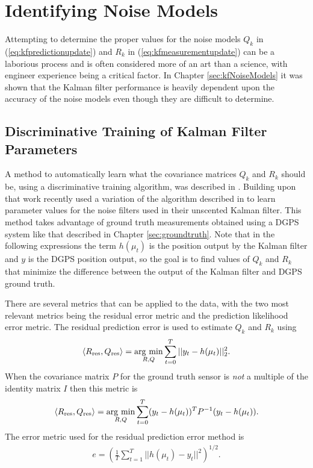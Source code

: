 \section{Identifying Noise Models}
\label{sec:kfIdentifyNoiseModels}
Attempting to determine the proper values for the noise models $Q_k$ in (\ref{eq:kfpredictionupdate}) and $R_k$ in (\ref{eq:kfmeasurementupdate}) can be a laborious process and is often considered more of an art than a science, with engineer experience being a critical factor. In Chapter \ref{sec:kfNoiseModels} it was shown that the Kalman filter performance is heavily dependent upon the accuracy of the noise models even though they are difficult to determine.

\subsection{Discriminative Training of Kalman Filter Parameters}
\label{sec:kftrainingparams}
A method to automatically learn what the covariance matrices $Q_k$ and $R_k$ should be, using a discriminative training algorithm, was described in \cite{Abbeel-RSS-05}. Building upon that work \cite{SakaiKuroda10} recently used a variation of the algorithm described in \cite{Abbeel-RSS-05} to learn parameter values for the noise filters used in their unscented Kalman filter. This method takes advantage of ground truth measurements obtained using a DGPS system like that described in Chapter \ref{sec:groundtruth}. Note that in the following expressions the term $h(\mu_t)$ is the position output by the Kalman filter and $y$ is the DGPS position output, so the goal is to find values of $Q_k$ and $R_k$ that minimize the difference between the output of the Kalman filter and DGPS ground truth.

There are several metrics that can be applied to the data, with the two most relevant metrics being the residual error metric and the prediction likelihood error metric. The residual prediction error is used to estimate $Q_k$ and $R_k$ using
\begin{align*}
\left<R_{\text{res}},Q_{\text{res}}\right> = \mathop{\arg\,\min}\limits_{R,Q}\sum_{t=0}^T ||y_t-h(\mu_t)||_2^2.
\end{align*}
When the covariance matrix $P$ for the ground truth sensor is \textit{not} a multiple of the identity matrix $I$ then this metric is
\begin{align*}
\left<R_{\text{res}},Q_{\text{res}}\right> = \mathop{\arg\,\min}\limits_{R,Q}\sum_{t=0}^T (y_t-h(\mu_t))^TP^{-1}(y_t-h(\mu_t)).
\end{align*}
The error metric used for the residual prediction error method is
\begin{align}
\label{eq:kftrainingres}
e = \left(\frac{1}{T}\sum_{t=1}^T ||h(\mu_t)-y_t||^2\right)^{1/2}.
\end{align}


